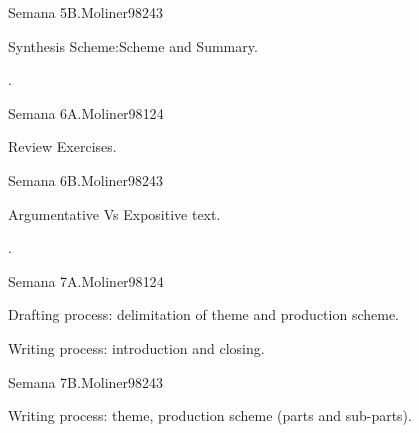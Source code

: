 \begin{syllabus}
\begin{unit}{Semana 5B.}{}{Moliner98}{24}{3}
   \begin{topics}
      \item Synthesis Scheme:Scheme and Summary.
   \end{topics}

   \begin{learningoutcomes}
      \item .
      \end{learningoutcomes}
\end{unit}

\begin{unit}{Semana 6A.}{}{Moliner98}{12}{4}
   \begin{topics}
      \item Review Exercises.
   \end{topics}
   \begin{learningoutcomes}
      \item 
   \end{learningoutcomes}
\end{unit}

\begin{unit}{Semana 6B.}{}{Moliner98}{24}{3}
   \begin{topics}
      \item Argumentative Vs Expositive text.
   \end{topics}

   \begin{learningoutcomes}
      \item . 
      \end{learningoutcomes}
\end{unit}

\begin{unit}{Semana 7A.}{}{Moliner98}{12}{4}
   \begin{topics}
      \item Drafting process: delimitation of theme and production scheme.
      \item Writing process: introduction and closing.
   \end{topics}
   \begin{learningoutcomes}
      \item 
   \end{learningoutcomes}
\end{unit}

\begin{unit}{Semana 7B.}{}{Moliner98}{24}{3}
   \begin{topics}
      \item Writing process: theme, production scheme (parts and sub-parts). 
   \end{topics}


\end{unit}
\end{syllabus}
